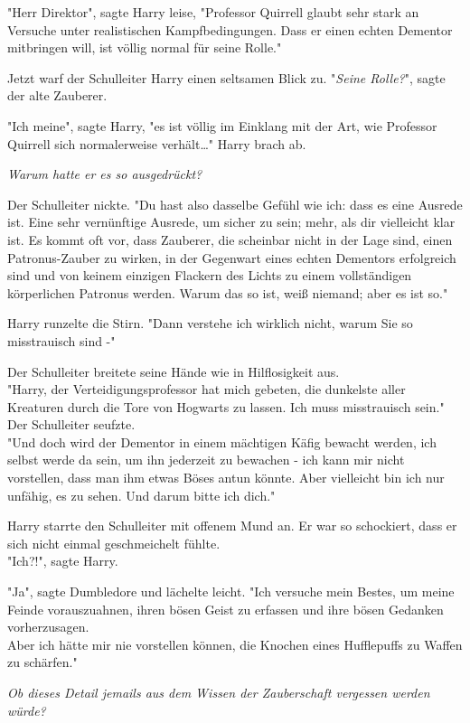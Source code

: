 {"Herr Direktor", sagte Harry leise, "Professor Quirrell glaubt sehr stark an Versuche unter realistischen Kampfbedingungen. Dass er einen echten Dementor mitbringen will, ist völlig normal für seine Rolle."

Jetzt warf der Schulleiter Harry einen seltsamen Blick zu. "\emph{Seine Rolle?}", sagte der alte Zauberer.

"Ich meine", sagte Harry, "es ist völlig im Einklang mit der Art, wie Professor Quirrell sich normalerweise verhält…" Harry brach ab.

\emph{Warum hatte er es so ausgedrückt?}

Der Schulleiter nickte. "Du hast also dasselbe Gefühl wie ich: dass es eine Ausrede ist. Eine sehr vernünftige Ausrede, um sicher zu sein; mehr, als dir vielleicht klar ist. Es kommt oft vor, dass Zauberer, die scheinbar nicht in der Lage sind, einen Patronus-Zauber zu wirken, in der Gegenwart eines echten Dementors erfolgreich sind und von keinem einzigen Flackern des Lichts zu einem vollständigen körperlichen Patronus werden. Warum das so ist, weiß niemand; aber es ist so."

Harry runzelte die Stirn. "Dann verstehe ich wirklich nicht, warum Sie so misstrauisch sind -"

Der Schulleiter breitete seine Hände wie in Hilflosigkeit aus.\\ "Harry, der Verteidigungsprofessor hat mich gebeten, die dunkelste aller Kreaturen durch die Tore von Hogwarts zu lassen. Ich muss misstrauisch sein."\\ Der Schulleiter seufzte.\\ "Und doch wird der Dementor in einem mächtigen Käfig bewacht werden, ich selbst werde da sein, um ihn jederzeit zu bewachen - ich kann mir nicht vorstellen, dass man ihm etwas Böses antun könnte. Aber vielleicht bin ich nur unfähig, es zu sehen. Und darum bitte ich dich."

Harry starrte den Schulleiter mit offenem Mund an. Er war so schockiert, dass er sich nicht einmal geschmeichelt fühlte.\\ "Ich?!", sagte Harry.

"Ja", sagte Dumbledore und lächelte leicht. "Ich versuche mein Bestes, um meine Feinde vorauszuahnen, ihren bösen Geist zu erfassen und ihre bösen Gedanken vorherzusagen.\\ Aber ich hätte mir nie vorstellen können, die Knochen eines Hufflepuffs zu Waffen zu schärfen."

\emph{Ob dieses Detail jemails aus dem Wissen der Zauberschaft vergessen werden würde?}

}
